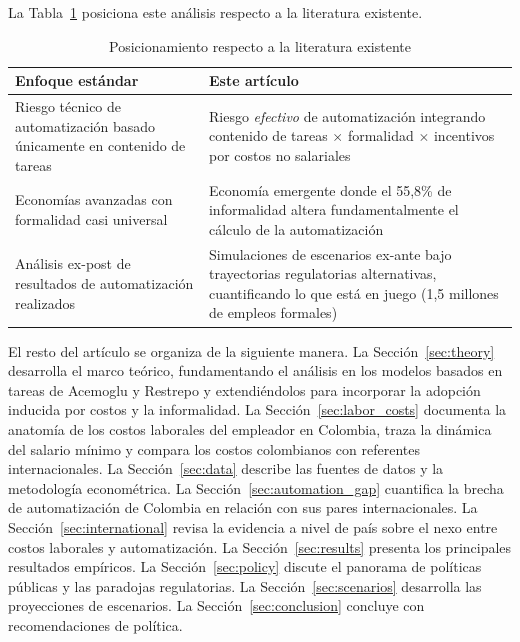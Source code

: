 \documentclass{article}
\begin{document}
La Tabla~\ref{tab:contributions} posiciona este an\'alisis respecto a la literatura existente.

\begin{table}[htbp]
\centering
\caption{Posicionamiento respecto a la literatura existente}
\label{tab:contributions}
\begin{tabular}{p{}p{}}
\toprule
\textbf{Enfoque est\'andar} & \textbf{Este art\'iculo} \\
\midrule
Riesgo t\'ecnico de automatizaci\'on basado \'unicamente en contenido de tareas \cite{frey2017future, arntz2016} & Riesgo \textit{efectivo} de automatizaci\'on integrando contenido de tareas $\times$ formalidad $\times$ incentivos por costos no salariales \\[6pt]
Econom\'ias avanzadas con formalidad casi universal \cite{acemoglu2020robots, dauth2021} & Econom\'ia emergente donde el 55,8\% de informalidad altera fundamentalmente el c\'alculo de la automatizaci\'on \\[6pt]
An\'alisis ex-post de resultados de automatizaci\'on realizados & Simulaciones de escenarios ex-ante bajo trayectorias regulatorias alternativas, cuantificando lo que est\'a en juego (1,5 millones de empleos formales) \\
\bottomrule
\end{tabular}
\end{table}

El resto del art\'iculo se organiza de la siguiente manera. La Secci\'on~\ref{sec:theory} desarrolla el marco te\'orico, fundamentando el an\'alisis en los modelos basados en tareas de Acemoglu y Restrepo y extendi\'endolos para incorporar la adopci\'on inducida por costos y la informalidad. La Secci\'on~\ref{sec:labor_costs} documenta la anatom\'ia de los costos laborales del empleador en Colombia, traza la din\'amica del salario m\'inimo y compara los costos colombianos con referentes internacionales. La Secci\'on~\ref{sec:data} describe las fuentes de datos y la metodolog\'ia econom\'etrica. La Secci\'on~\ref{sec:automation_gap} cuantifica la brecha de automatizaci\'on de Colombia en relaci\'on con sus pares internacionales. La Secci\'on~\ref{sec:international} revisa la evidencia a nivel de pa\'is sobre el nexo entre costos laborales y automatizaci\'on. La Secci\'on~\ref{sec:results} presenta los principales resultados emp\'iricos. La Secci\'on~\ref{sec:policy} discute el panorama de pol\'iticas p\'ublicas y las paradojas regulatorias. La Secci\'on~\ref{sec:scenarios} desarrolla las proyecciones de escenarios. La Secci\'on~\ref{sec:conclusion} concluye con recomendaciones de pol\'itica.
\end{document}

